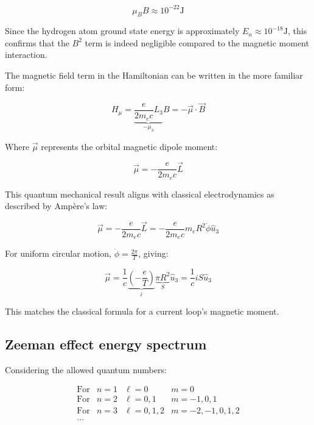 \documentclass[italian]{HKNdocument}
\begin{document}
\begin{equation}
\mu_{B}B \approx 10^{-22} \text{J} \label{eq:12.21}
\end{equation}

Since the hydrogen atom ground state energy is approximately $E_n \approx 10^{-18} \text{J}$, this confirms that the $B^2$ term is indeed negligible compared to the magnetic moment interaction.

The magnetic field term in the Hamiltonian can be written in the more familiar form:

\begin{equation}
H_{\mu}=\underbrace{\frac{e}{2m_e c}L_3}_{-\mu_3}B=-\vec{\mu}\cdot\vec{B} \label{eq:12.22}
\end{equation}

Where $\vec{\mu}$ represents the orbital magnetic dipole moment:

\begin{equation}
\vec{\mu}=-\frac{e}{2m_e c}\vec{L} \label{eq:12.23}
\end{equation}

This quantum mechanical result aligns with classical electrodynamics as described by Ampère's law:

\begin{equation}
\vec{\mu}=-\frac{e}{2m_e c}\vec{L}=-\frac{e}{2m_e c}m_e R^2\dot{\phi}\hat{u}_3 \label{eq:12.24}
\end{equation}

For uniform circular motion, $\dot{\phi}=\frac{2\pi}{T}$, giving:

\begin{equation}
\vec{\mu}=\frac{1}{c}\underbrace{\left(-\frac{e}{T}\right)}_i \underbrace{\pi R^2}_S \hat{u}_3=\frac{1}{c}iS\hat{u}_3 \label{eq:12.25}
\end{equation}

This matches the classical formula for a current loop's magnetic moment.

\subsection{Zeeman effect energy spectrum}
Considering the allowed quantum numbers:

$$
\begin{array}{llll}
\text{For} & n=1 & \ell=0 & m=0 \\
\text{For} & n=2 & \ell=0,1 & m=-1,0,1 \\
\text{For} & n=3 & \ell=0,1,2 & m=-2,-1,0,1,2 \\
\ldots & & &
\end{array}
$$
\end{document}
